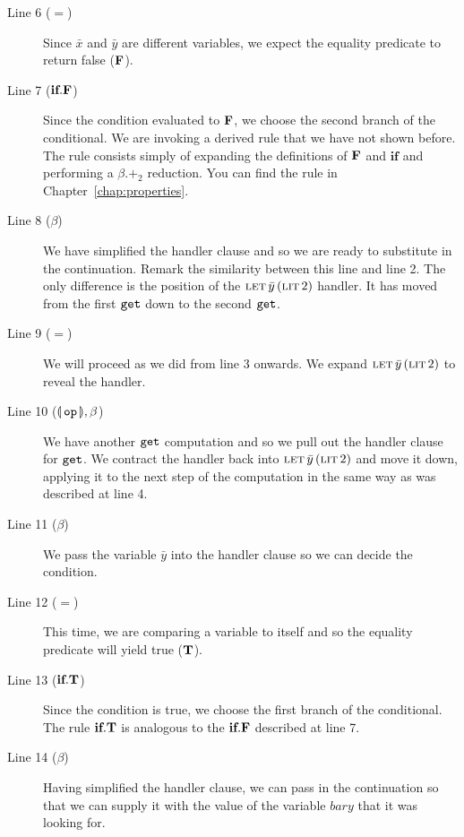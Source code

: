 \begin{description}
  \item[Line 6 ($=$)] Since $\bar{x}$ and $\bar{y}$ are different
    variables, we expect the equality predicate to return false ($\textbf{F}$).

  \item[Line 7 ($\textbf{if}.\textbf{F}$)] Since the condition evaluated to
    $\textbf{F}$, we choose the second branch of the conditional. We are
    invoking a derived rule that we have not shown before. The rule
    consists simply of expanding the definitions of $\textbf{F}$ and
    $\textbf{if}$ and performing a $\beta.+_2$ reduction. You can find the
    rule in Chapter~\ref{chap:properties}.

  \item[Line 8 ($\beta$)] We have simplified the handler clause and so
    we are ready to substitute in the continuation. Remark the similarity
    between this line and line 2. The only difference is the position of
    the $\textsc{let}\,\bar{y}\,(\textsc{lit}\,2)$ handler. It has moved from the
    first $\mathtt{get}$ down to the second $\mathtt{get}$.

  \item[Line 9 ($=$)] We will proceed as we did from line 3 onwards. We
    expand $\textsc{let}\,\bar{y}\,(\textsc{lit}\,2)$ to reveal the handler.

  \item[Line 10 ($\llparenthesis \, \mathtt{op} \, \rrparenthesis,\beta$)] We have another $\mathtt{get}$
    computation and so we pull out the handler clause for $\mathtt{get}$. We
    contract the handler back into $\textsc{let}\,\bar{y}\,(\textsc{lit}\,2)$ and
    move it down, applying it to the next step of the computation in the
    same way as was described at line 4.

  \item[Line 11 ($\beta$)] We pass the variable $\bar{y}$ into the
    handler clause so we can decide the condition.

  \item[Line 12 ($=$)] This time, we are comparing a variable to itself and
    so the equality predicate will yield true ($\textbf{T}$).

  \item[Line 13 ($\textbf{if}.\textbf{T}$)] Since the condition is true, we
    choose the first branch of the conditional. The rule
    $\textbf{if}.\textbf{T}$ is analogous to the $\textbf{if}.\textbf{F}$ described
    at line 7.

  \item[Line 14 ($\beta$)] Having simplified the handler clause, we can
    pass in the continuation so that we can supply it with the value of the
    variable $bar{y}$ that it was looking for.


\end{description}
